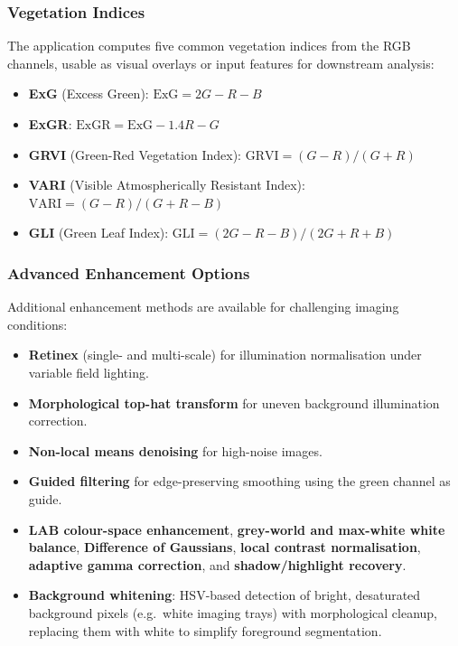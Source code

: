 \documentclass[12pt, a4paper]{article}
\begin{document}
\subsubsection{Vegetation Indices}

The application computes five common vegetation indices from the RGB channels, usable as visual overlays or input features for downstream analysis:

\begin{itemize}
    \item \textbf{ExG} (Excess Green): $\mathrm{ExG} = 2G - R - B$
          \citep{woebbecke1995color}
    \item \textbf{ExGR}: $\mathrm{ExGR} = \mathrm{ExG} - 1.4R - G$
    \item \textbf{GRVI} (Green-Red Vegetation Index):
          $\mathrm{GRVI} = (G - R)/(G + R)$ \citep{tucker1979red}
    \item \textbf{VARI} (Visible Atmospherically Resistant Index):
          $\mathrm{VARI} = (G - R)/(G + R - B)$ \citep{gitelson2002novel}
    \item \textbf{GLI} (Green Leaf Index):
          $\mathrm{GLI} = (2G - R - B)/(2G + R + B)$ \citep{louhaichi2001spatially}
\end{itemize}

\subsubsection{Advanced Enhancement Options}

Additional enhancement methods are available for challenging imaging
conditions:

\begin{itemize}
    \item \textbf{Retinex} (single- and multi-scale) \citep{jobson1997multiscale}
          for illumination normalisation under variable field lighting.
    \item \textbf{Morphological top-hat transform} \citep{serra1983image} for
          uneven background illumination correction.
    \item \textbf{Non-local means denoising} \citep{buades2005non} for
          high-noise images.
    \item \textbf{Guided filtering} \citep{he2013guided} for edge-preserving
          smoothing using the green channel as guide.
    \item \textbf{LAB colour-space enhancement}, \textbf{grey-world and
          max-white white balance}, \textbf{Difference of Gaussians},
          \textbf{local contrast normalisation}, \textbf{adaptive gamma
          correction}, and \textbf{shadow/highlight recovery}.
    \item \textbf{Background whitening}: HSV-based detection of
          bright, desaturated background pixels (e.g.\ white imaging trays)
          with morphological cleanup, replacing them with white to simplify
          foreground segmentation.
\end{itemize}
\end{document}

